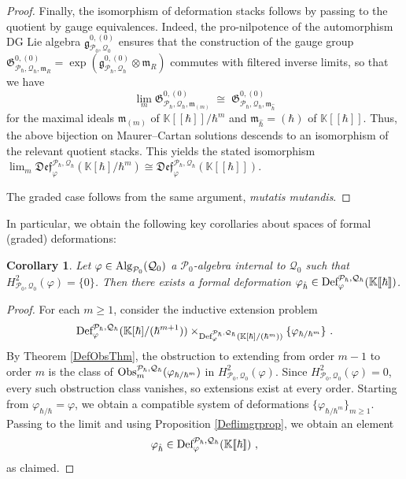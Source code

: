 \documentclass[11pt]{amsart}
\numberwithin{equation}{section}
\newtheorem{coro}[theo]{Corollary}
\theoremstyle{definition}
\newcommand{\bb}{\mathbb}
\newcommand{\mc}{\mathcal}
\newcommand{\mf}{\mathfrak}
\newcommand{\Def}{{\textup{Def}}}
\newcommand{\fDef}{{\mathfrak{Def}}}
\newcommand{\Ph}{{\mathcal{P}_\hbar}}
\newcommand{\Qh}{{\mathcal{Q}_\hbar}}
\newcommand{\fph}{{[\![\hbar]\!]}}
\newcommand{\Kh}{{\K[\hbar]}}
\newcommand{\Kfph}{{\mathbb{K}[\![\hbar]\!]}}
\newcommand{\K}{{\bb K}}
\newcommand{\Obs}{{\textup{Obs}}}
\newcommand{\Alg}{{\textup{Alg}}}
\newcommand{\0}{{\textbf{0}}}
\newcommand{\g}{{\mf{g}}}
\def \mf{\mathfrak}
\begin{document}
\begin{proof}
Finally, the isomorphism of deformation stacks follows by passing to the quotient by gauge equivalences. Indeed, the pro-nilpotence of the automorphism DG Lie algebra $\g_{\mc P_0,\mc Q_0}^{0,(0)}$ ensures that the construction of the gauge group $\mf G^{0,(0)}_{\Ph,\Qh,\mf m_R}=\exp(\g^{0,(0)}_{\Ph,\Qh}\otimes \mf m_R)$ commutes with filtered inverse limits, so that we have 
\[ 
\lim_{m}\mf G^{0,(0)}_{\Ph,\Qh,\mf m_{(m)}} \;\cong\; \mf G^{0,(0)}_{\Ph,\Qh,\mf m_{\hat \hbar}} 
\] 
for the maximal ideals $\mf m_{(m)}$ of $\Kfph/\hbar^m$ and $\mf m_{\hat \hbar}=(\hbar)$ of $\Kfph$. Thus, the above bijection on Maurer--Cartan solutions descends to an isomorphism of the relevant quotient stacks. This yields the stated isomorphism $\lim_{m}\fDef_\varphi^{\Ph,\Qh}(\K[\hbar]/\hbar^m) \cong \fDef_\varphi^{\Ph,\Qh}(\K\fph)$.

The graded case follows from the same argument, \emph{mutatis mutandis}.
\end{proof}



In particular, we obtain the following key corollaries about spaces of formal (graded) deformations:


\begin{coro}\label{forexcoro} Let $\varphi\in \Alg_{\mc P_0}(\mc Q_0)$ a $\mc P_0$-algebra internal to $\mc Q_0$ such that $H^{2}_{\mc P_0,\mc Q_0}(\varphi)=\{0\}$. Then there exists a formal deformation $\varphi_{\hat{\hbar}}\in \Def_{\varphi}^{\Ph,\Qh}(\K\fph)$.
	
\end{coro}
\begin{proof}
For each $m\ge 1$, consider the inductive extension problem
\[
\Def^{\Ph,\Qh}_\varphi(\Kh/(\hbar^{m+1}))\times_{\Def^{\Ph,\Qh}_\varphi(\Kh/(\hbar^{m}))}\{\varphi_{\hbar/\hbar^m}\} \ .
\]
By Theorem \ref{DefObsThm}, the obstruction to extending from order $m-1$ to order $m$ is the class of $\Obs_m^{\Ph,\Qh}(\varphi_{\hbar/\hbar^m})$ in $H^2_{\mc P_0,\mc Q_0}(\varphi)$.
Since $H^2_{\mc P_0,\mc Q_0}(\varphi)=0$, every such obstruction class vanishes, so extensions exist at every order. Starting from $\varphi_{\hbar/\hbar}=\varphi$, we obtain a compatible system of deformations $\{\varphi_{\hbar/\hbar^m}\}_{m\ge 1}$. Passing to the limit and using Proposition \ref{Deflimgrprop}, we obtain an element
\[
\varphi_{\hat{\hbar}}\in \Def_{\varphi}^{\Ph,\Qh}(\K\fph) \ ,
\]
as claimed.
\end{proof}
\end{document}
